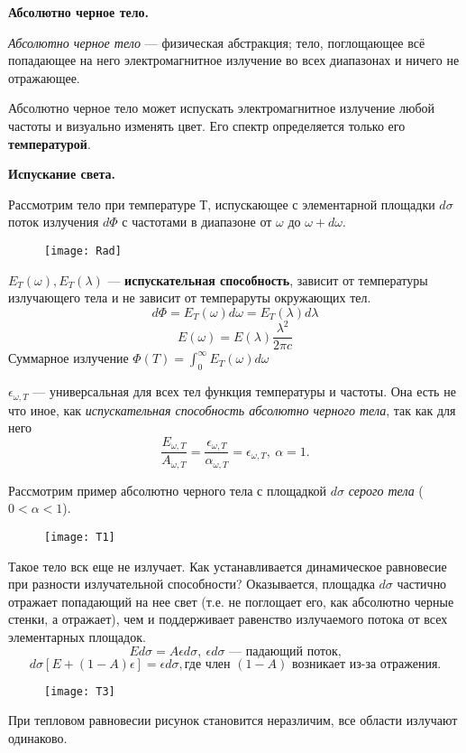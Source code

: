 \textbf{Абсолютно черное тело.}

\textit{Абсолютно черное тело} --- физическая абстракция; тело, поглощающее всё попадающее на него электромагнитное излучение во всех диапазонах и ничего не отражающее.

Абсолютно черное тело может испускать электромагнитное излучение любой частоты и визуально изменять цвет. Его спектр определяется только его \textbf{температурой}.

\textbf{Испускание света.}

Рассмотрим тело при температуре $Т$, испускающее с элементарной площадки $d\sigma$ поток излучения $d\Phi$ с частотами в диапазоне от $\omega$ до $\omega + d\omega$.

\begin{figure}[H]
	\centering
	\texttt{[image: Rad]}
\end{figure}
$E_T(\omega), E_T(\lambda)$ --- \textbf{испускательная способность}, зависит от температуры излучающего тела и не зависит от темпераруты окружающих тел.
$$d\Phi = E_T(\omega)d\omega = E_T(\lambda)d\lambda$$
$$E(\omega)=E(\lambda)\frac{\lambda^2}{2\pi c}$$
Суммарное излучение $\Phi(T) = \int_{0}^{\infty}E_T(\omega)d\omega$

$\epsilon_{\omega, T}$ --- универсальная для всех тел функция температуры и частоты. Она есть не что иное, как \textit{испускательная способность абсолютно черного тела}, так как для него $$\frac{E_{\omega, T}}{A_{\omega, T}}=\frac{\epsilon_{\omega, T}}{\alpha_{\omega, T}}=\epsilon_{\omega, T}, \ \alpha = 1.$$

Рассмотрим пример абсолютно черного тела с площадкой $d\sigma$ \textit{серого тела} ($0<\alpha <1$).
\begin{figure}[H]
	\centering
	\texttt{[image: T1]}
\end{figure}

Такое тело вск еще не излучает. Как устанавливается динамическое равновесие при разности излучательной способности?
Оказывается, площадка $d\sigma$ частично отражает попадающий на нее свет (т.е. не поглощает его, как абсолютно черные стенки, а отражает), чем и поддерживает равенство излучаемого потока от всех элементарных площадок.
$$Ed\sigma = A\epsilon d\sigma, \ \epsilon d\sigma \mbox{ --- падающий поток,}$$
$$d\sigma[E + (1 - A)\epsilon] = \epsilon d\sigma, \mbox{где член } (1 - A) \mbox{ возникает из-за отражения.}$$

\begin{figure}[H]
	\centering
	\texttt{[image: T3]}
\end{figure}
При тепловом равновесии рисунок становится неразличим, все области излучают одинаково.